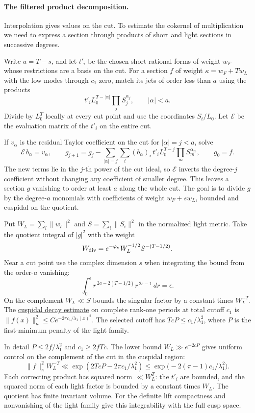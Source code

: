 \paragraph{The filtered product decomposition.}

Interpolation gives values on the cut. To estimate the cokernel of multiplication we need to express a section through products of short and light sections in successive degrees.

Write \(a=T-s\), and let \(t'_i\) be the chosen short
rational forms of weight \(w_F\) whose restrictions
are a basis on the cut. For a section \(f\) of weight
\(\kappa=w_F+Tw_L\) with the low modes through \(c_1\)
zero, match its jets of order less than \(a\) using
the products
\[
            t'_i L_0^{T-|\alpha|}\prod_j S_j^{\alpha_j},
           \qquad |\alpha|<a .
\]
Divide by \(L_0^T\) locally at every cut point and use
the coordinates \(S_i/L_0\). Let \(\mathcal E\) be the evaluation matrix of the \(t'_i\) on
the entire cut.

If \(v_\alpha\) is the residual Taylor coefficient
on the cut for \(|\alpha|=j<a\), solve
\[
       \mathcal E\,b_\alpha=v_\alpha,\qquad
       g_{j+1}=g_j-\sum_{|\alpha|=j}\sum_i(b_\alpha)_i\,
             t'_i L_0^{T-j}\prod_m S_m^{\alpha_m},
       \qquad g_0=f .
\]
The new terms lie in the \(j\)-th power of the cut ideal, so
\(\mathcal E\) inverts the degree-\(j\) coefficient without
changing any coefficient of smaller degree. This leaves a section \(g\) vanishing
to order at least \(a\) along the whole cut. The goal
is to divide \(g\) by the degree-\(a\) monomials
with coefficients of weight \(w_F+s w_L\), bounded
and cuspidal on the quotient.

Put \(W_L=\sum_l\|w_l\|^2\) and
\(S=\sum_i\|S_i\|^2\) in the normalized light metric.
Take the quotient integral of \(|g|^2\) with the
weight
\[
     W_{\rm div}=e^{-\varphi_\kappa}
                           W_L^{-1/2}S^{-(T-1/2)} .
\]
Near a cut point use the complex dimension \(s\) when integrating
the bound from the order-\(a\) vanishing:
\[
   \int_0^\epsilon r^{\,2a-2(T-1/2)}r^{\,2s-1}\,dr=\epsilon .
\]
On the complement \(W_L\ll S\) bounds the singular factor
by a constant times \(W_L^{-T}\).
The \hyperref[par:slice-cusp-decay]{cuspidal decay estimate}
on complete rank-one periods at total cutoff \(c_1\) is
\(\|f(x)\|_{\kappa}^2\le C e^{-2\pi c_1/\lambda_1(x)^2}\).
The selected cutoff has \(TcP\le c_1/\lambda_1^2\),
where \(P\) is the first-minimum penalty of the light
family.

In detail \(P\le2 f/\lambda_1^2\) and
\(c_1\ge 2fTc\). The lower bound \(W_L\gg e^{-2cP}\) gives uniform control
on the complement of the cut in the cuspidal region:
\[
   \|f\|_\kappa^2 W_L^{-T}
    \ll \exp(2TcP-2\pi c_1/\lambda_1^2)
    \le \exp\bigl(-2(\pi-1)c_1/\lambda_1^2\bigr).
\]
Each correcting product has squared norm \(\ll W_L^T\):
the \(t'_i\) are bounded, and the squared norm of each light
factor is bounded by a constant times \(W_L\). The quotient has finite invariant
volume. For the definite lift compactness and
nonvanishing of the light family give this integrability
with the full cusp space.

